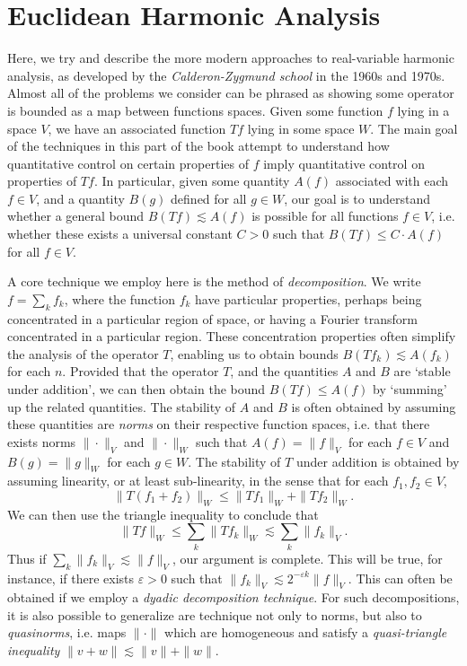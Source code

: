 
\part{Euclidean Harmonic Analysis}

Here, we try and describe the more modern approaches to real-variable harmonic analysis, as developed by the \emph{Calderon-Zygmund school} in the 1960s and 1970s. Almost all of the problems we consider can be phrased as showing some operator is bounded as a map between functions spaces. Given some function $f$ lying in a space $V$, we have an associated function $Tf$ lying in some space $W$. The main goal of the techniques in this part of the book attempt to understand how quantitative control on certain properties of $f$ imply quantitative control on properties of $Tf$. In particular, given some quantity $A(f)$ associated with each $f \in V$, and a quantity $B(g)$ defined for all $g \in W$, our goal is to understand whether a general bound $B(Tf) \lesssim A(f)$ is possible for all functions $f \in V$, i.e. whether these exists a universal constant $C > 0$ such that $B(Tf) \leq C \cdot A(f)$ for all $f \in V$.

A core technique we employ here is the method of \emph{decomposition}. We write $f = \sum_k f_k$, where the function $f_k$ have particular properties, perhaps being concentrated in a particular region of space, or having a Fourier transform concentrated in a particular region. These concentration properties often simplify the analysis of the operator $T$, enabling us to obtain bounds $B(Tf_k) \lesssim A(f_k)$ for each $n$. Provided that the operator $T$, and the quantities $A$ and $B$ are `stable under addition', we can then obtain the bound $B(Tf) \leq A(f)$ by `summing' up the related quantities. The stability of $A$ and $B$ is often obtained by assuming these quantities are \emph{norms} on their respective function spaces, i.e. that there exists norms $\| \cdot \|_V$ and $\| \cdot \|_W$ such that $A(f) = \| f \|_V$ for each $f \in V$ and $B(g) = \| g \|_W$ for each $g \in W$. The stability of $T$ under addition is obtained by assuming linearity, or at least sub-linearity, in the sense that for each $f_1, f_2 \in V$,
%
\[ \| T(f_1 + f_2) \|_W \leq \| T f_1 \|_W + \| Tf_2 \|_W. \]
%
We can then use the triangle inequality to conclude that
%
\[ \| Tf \|_W \leq \sum_k \| Tf_k \|_W \lesssim \sum_k \| f_k \|_V. \]
%
Thus if $\sum_k \| f_k \|_V \lesssim \| f \|_V$, our argument is complete. This will be true, for instance, if there exists $\varepsilon > 0$ such that $\| f_k \|_V \lesssim 2^{- \varepsilon k} \| f \|_V$. This can often be obtained if we employ a \emph{dyadic decomposition technique}. For such decompositions, it is also possible to generalize are technique not only to norms, but also to \emph{quasinorms}, i.e. maps $\| \cdot \|$ which are homogeneous and satisfy a \emph{quasi-triangle inequality} $\| v + w \| \lesssim \| v \| + \| w \|$.

